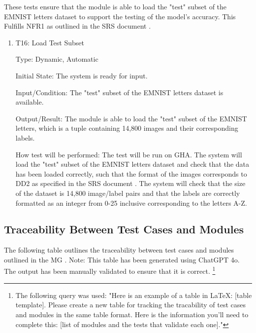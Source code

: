 \documentclass[12pt, titlepage]{article}
\begin{document}
These tests ensure that the module is able to load the "test" subset of the
EMNIST letters dataset to support the testing of the model's accuracy. This
Fulfills NFR1 as outlined in the SRS document \citep{SRS}.

\begin{enumerate}

\item{T16: Load Test Subset\\}

Type: Dynamic, Automatic

Initial State: The \progname{} system is ready for input.

Input/Condition: The "test" subset of the EMNIST letters dataset is available.

Output/Result: The module is able to load the "test" subset of the EMNIST
letters, which is a tuple containing 14,800 images and their corresponding
labels.

How test will be performed: The test will be run on GHA. The system will load
the "test" subset of the EMNIST letters dataset and check that the data has been
loaded correctly, such that the format of the images corresponds to DD2 as
specified in the SRS document \citep{SRS}. The system will check that the size
of the dataset is 14,800 image/label pairs and that the labels are correctly
formatted as an integer from 0-25 inclusive corresponding to the letters A-Z.

\end{enumerate}


\subsection{Traceability Between Test Cases and Modules}

The following table outlines the traceability between test cases and modules
outlined in the MG \citep{MG}. Note: This table has been generated using ChatGPT
4o. The output has been manually validated to ensure that it is correct.
\footnote{The following query was used: "Here is an example of a table in LaTeX:
[table template]. Please create a new table for tracking the tracability of test cases and modules in the same table format. Here is the information you'll need to complete this: [list of modules and the tests that validate each one]."}

\end{document}
